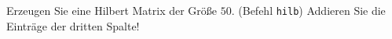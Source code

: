 \begin{aufg}[0]
Erzeugen Sie eine Hilbert Matrix der Größe $50$. (Befehl
  \lstinline!hilb!) Addieren
  Sie die Einträge der dritten Spalte! 
\end{aufg}